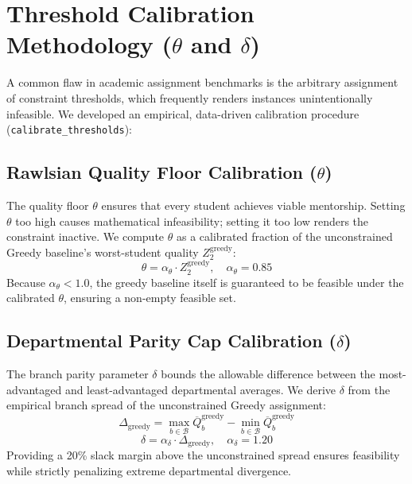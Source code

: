 \section{Threshold Calibration Methodology ($\theta$ and $\delta$)}
A common flaw in academic assignment benchmarks is the arbitrary assignment of constraint thresholds, which frequently renders instances unintentionally infeasible. We developed an empirical, data-driven calibration procedure (\texttt{calibrate\_thresholds}):

\subsection{Rawlsian Quality Floor Calibration ($\theta$)}
The quality floor $\theta$ ensures that every student achieves viable mentorship. Setting $\theta$ too high causes mathematical infeasibility; setting it too low renders the constraint inactive. We compute $\theta$ as a calibrated fraction of the unconstrained Greedy baseline's worst-student quality $Z_2^{\text{greedy}}$:
\begin{equation}
    \theta = \alpha_{\theta} \cdot Z_2^{\text{greedy}}, \quad \alpha_{\theta} = 0.85
\end{equation}
Because $\alpha_{\theta} < 1.0$, the greedy baseline itself is guaranteed to be feasible under the calibrated $\theta$, ensuring a non-empty feasible set.

\subsection{Departmental Parity Cap Calibration ($\delta$)}
The branch parity parameter $\delta$ bounds the allowable difference between the most-advantaged and least-advantaged departmental averages. We derive $\delta$ from the empirical branch spread of the unconstrained Greedy assignment:
\begin{equation}
    \Delta_{\text{greedy}} = \max_{b \in \mathcal{B}} \overline{Q}_b^{\text{greedy}} - \min_{b \in \mathcal{B}} \overline{Q}_b^{\text{greedy}}
\end{equation}
\begin{equation}
    \delta = \alpha_{\delta} \cdot \Delta_{\text{greedy}}, \quad \alpha_{\delta} = 1.20
\end{equation}
Providing a 20\% slack margin above the unconstrained spread ensures feasibility while strictly penalizing extreme departmental divergence.

